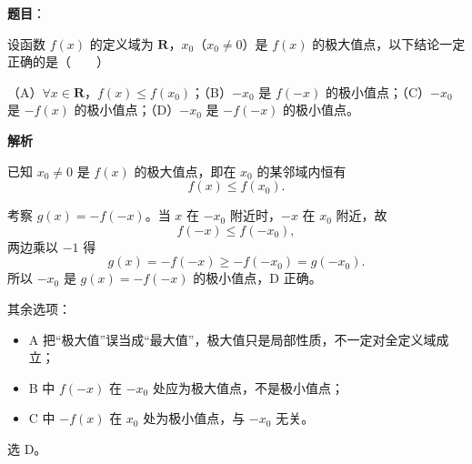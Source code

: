 \begin{answer}

\textbf{题目}：

设函数 $f(x)$ 的定义域为 $\mathbf R$，$x_0$（$x_0\neq0$）是 $f(x)$ 的极大值点，以下结论一定正确的是\mbox{（　　）}

（A）$\forall x\in\mathbf R$，$f(x)\leqslant f(x_0)$；（B）$-x_0$ 是 $f(-x)$ 的极小值点；（C）$-x_0$ 是 $-f(x)$ 的极小值点；（D）$-x_0$ 是 $-f(-x)$ 的极小值点。

\textbf{解析}

已知 $x_0\neq0$ 是 $f(x)$ 的极大值点，即在 $x_0$ 的某邻域内恒有
\nopagebreak[4]
\[f(x)\leqslant f(x_0).\]

考察 $g(x)=-f(-x)$。当 $x$ 在 $-x_0$ 附近时，$-x$ 在 $x_0$ 附近，故
\nopagebreak[4]
\[f(-x)\leqslant f(-x_0),\]
两边乘以 $-1$ 得
\nopagebreak[4]
\[g(x)=-f(-x)\geqslant-f(-x_0)=g(-x_0).\]
所以 $-x_0$ 是 $g(x)=-f(-x)$ 的极小值点，D 正确。

其余选项：

\begin{itemize}
\item A 把“极大值”误当成“最大值”，极大值只是局部性质，不一定对全定义域成立；
\item B 中 $f(-x)$ 在 $-x_0$ 处应为极大值点，不是极小值点；
\item C 中 $-f(x)$ 在 $x_0$ 处为极小值点，与 $-x_0$ 无关。
\end{itemize}

选 D。


\end{answer}

